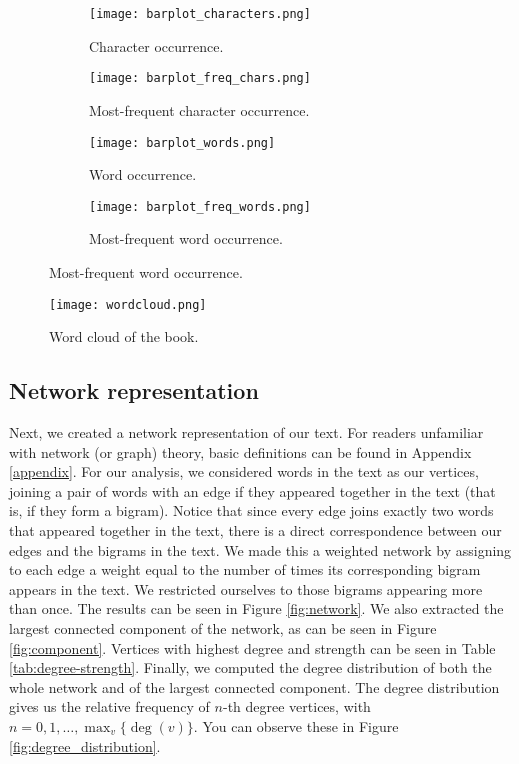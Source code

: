 \documentclass[letterpaper, 10 pt, conference]{article}
\begin{document}
 \begin{figure}
 	\centering
 	\caption{Barplots of words and characters occurences.} 
 	\begin{subfigure}[b]{0.45\linewidth}
 		\caption{Character occurrence.}
 		\texttt{[image: barplot\_characters.png]}
 	\end{subfigure}
 	\begin{subfigure}[b]{0.45\linewidth}
 		\caption{Most-frequent character occurrence.}
 		\texttt{[image: barplot\_freq\_chars.png]}
 	\end{subfigure}
 	\begin{subfigure}[b]{0.45\linewidth}
 		\caption{Word occurrence.}
 		\texttt{[image: barplot\_words.png]}
 	\end{subfigure}
	\begin{subfigure}[b]{0.45\linewidth}
 		\caption{Most-frequent word occurrence.}
 		\texttt{[image: barplot\_freq\_words.png]}
 	\end{subfigure}
 	\label{fig:barplots_chars_words}
 \end{figure}

\begin{figure}
	\centering
	\caption{Word cloud of the book.}
	\texttt{[image: wordcloud.png]}
	\label{fig:wordcloud}
\end{figure}


\subsection{Network representation}
Next, we created a network representation of our text. For readers unfamiliar with network (or graph) theory, basic definitions can be found in Appendix \ref{appendix}. For our analysis, we considered words in the text as our vertices, joining a pair of words with an edge if they appeared together in the text (that is, if they form a bigram). Notice that since every edge joins exactly two words that appeared together in the text, there is a direct correspondence between our edges and the bigrams in the text. We made this a weighted network by assigning to each edge a weight equal to the number of times its corresponding bigram appears in the text. We restricted ourselves to those bigrams appearing more than once. The results can be seen in Figure \ref{fig:network}.  We also extracted the largest connected component of the network, as can be seen in Figure \ref{fig:component}. Vertices with highest degree and strength can be seen in Table \ref{tab:degree-strength}. Finally, we computed the degree distribution of both the whole network and of the largest connected component. The degree distribution gives us the relative frequency of $n$-th degree vertices, with $n = 0, 1, \dots, \max_{v} \lbrace \deg (v) \rbrace$. You can observe these in Figure \ref{fig:degree_distribution}. 
\end{document}
